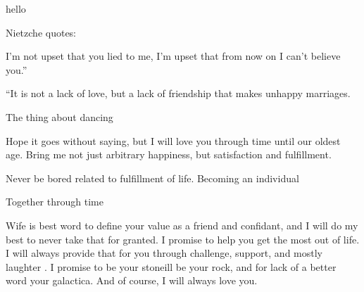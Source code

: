 \documentclass{letter}
\begin{document}
    
    hello

    Nietzche quotes:

    I'm not upset that you lied to me, I'm upset that from now on I can't believe you.” 

“It is not a lack of love, but a lack of friendship that makes unhappy marriages.

The thing about dancing

Hope it goes without saying, but I will love you through time until our oldest age.  
Bring me not just arbitrary happiness, but satisfaction and fulfillment.  


Never be bored related to fulfillment of life.  Becoming an individual

Together through time

Wife is best word to define your value as a friend and confidant, and I will do my best to never
take that for granted. I promise to help you get the most out of life.  I will always provide that for you through challenge, support, and mostly laughter .  I promise to be your stoneill be your rock, and for lack of a better word your galactica. 
And of course, I will always love you.
\end{document}
